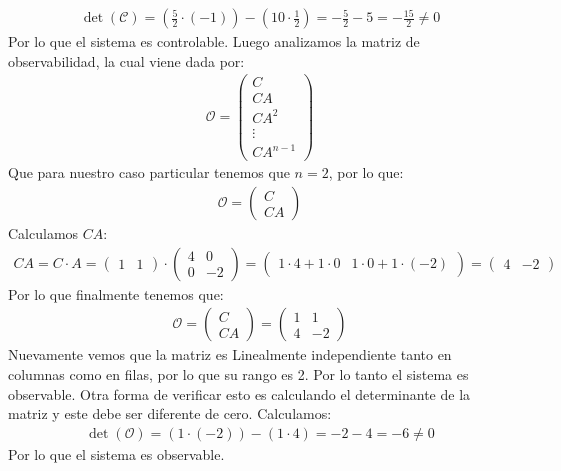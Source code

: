 \documentclass[
  11pt,
  letterpaper,
   addpoints,
   answers
  ]{exam}
\begin{document}
\begin{questions}
\begin{solution}
\begin{align}
  \det(\mathcal C) = \left( \frac{5}{2} \cdot (-1) \right) - (10 \cdot \frac{1}{2}) = -\frac{5}{2} - 5 = -\frac{15}{2} \neq 0
\end{align}
Por lo que el sistema es controlable. Luego analizamos la matriz de observabilidad, la cual viene dada por:
\begin{align}
  \mathcal O = \begin{pmatrix} C \\ CA \\ CA^2 \\ \vdots \\ CA^{n-1} \end{pmatrix}
\end{align}
Que para nuestro caso particular tenemos que $n=2$, por lo que:
\begin{align}
  \mathcal O = \begin{pmatrix} C \\ CA \end{pmatrix}
\end{align}
Calculamos $CA$:
\begin{align}
  CA = C \cdot A = \begin{pmatrix} 1 & 1 \end{pmatrix} \cdot \begin{pmatrix} 4 & 0 \\ 0 & -2 \end{pmatrix} = \begin{pmatrix} 1 \cdot 4 + 1 \cdot 0 & 1 \cdot 0 + 1 \cdot (-2) \end{pmatrix} = \begin{pmatrix} 4 & -2 \end{pmatrix}
\end{align}
Por lo que finalmente tenemos que:
\begin{align}
  \mathcal O = \begin{pmatrix} C \\ CA \end{pmatrix} = \begin{pmatrix} 1 & 1 \\ 4 & -2 \end{pmatrix}
\end{align}
Nuevamente vemos que la matriz es Linealmente independiente tanto en columnas como en filas, por lo que su rango es 2. Por lo tanto el sistema es observable. Otra forma de verificar esto es calculando el determinante de la matriz y este debe ser diferente de cero. Calculamos:
\begin{align}
  \det(\mathcal O) = (1 \cdot (-2)) - (1 \cdot 4) = -2 - 4 = -6 \neq 0
\end{align}
Por lo que el sistema es observable.

\end{solution}
\end{questions}
\end{document}
